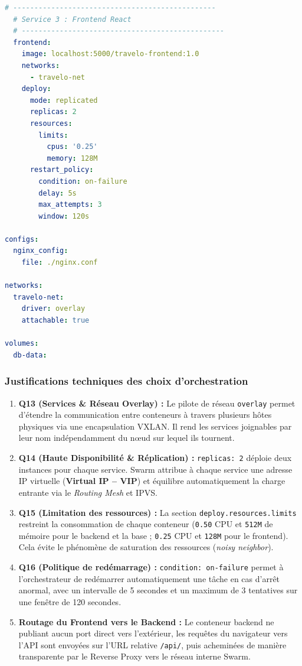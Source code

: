 \documentclass[11pt,a4paper]{article}
\begin{document}
\begin{lstlisting}[language=yaml]
  # ------------------------------------------------
  # Service 3 : Frontend React
  # ------------------------------------------------
  frontend:
    image: localhost:5000/travelo-frontend:1.0
    networks:
      - travelo-net
    deploy:
      mode: replicated
      replicas: 2
      resources:
        limits:
          cpus: '0.25'
          memory: 128M
      restart_policy:
        condition: on-failure
        delay: 5s
        max_attempts: 3
        window: 120s

configs:
  nginx_config:
    file: ./nginx.conf

networks:
  travelo-net:
    driver: overlay
    attachable: true

volumes:
  db-data:
\end{lstlisting}

\subsubsection{Justifications techniques des choix d'orchestration}
\begin{enumerate}
  \item \textbf{Q13 (Services \& Réseau Overlay) :} Le pilote de réseau \texttt{overlay} permet d'étendre la communication entre conteneurs à travers plusieurs hôtes physiques via une encapsulation VXLAN. Il rend les services joignables par leur nom indépendamment du nœud sur lequel ils tournent.
  \item \textbf{Q14 (Haute Disponibilité \& Réplication) :} \texttt{replicas: 2} déploie deux instances pour chaque service. Swarm attribue à chaque service une adresse IP virtuelle (\textbf{Virtual IP -- VIP}) et équilibre automatiquement la charge entrante via le \textit{Routing Mesh} et IPVS.
  \item \textbf{Q15 (Limitation des ressources) :} La section \texttt{deploy.resources.limits} restreint la consommation de chaque conteneur (\texttt{0.50} CPU et \texttt{512M} de mémoire pour le backend et la base ; \texttt{0.25} CPU et \texttt{128M} pour le frontend). Cela évite le phénomène de saturation des ressources (\textit{noisy neighbor}).
  \item \textbf{Q16 (Politique de redémarrage) :} \texttt{condition: on-failure} permet à l'orchestrateur de redémarrer automatiquement une tâche en cas d'arrêt anormal, avec un intervalle de 5 secondes et un maximum de 3 tentatives sur une fenêtre de 120 secondes.
  \item \textbf{Routage du Frontend vers le Backend :} Le conteneur backend ne publiant aucun port direct vers l'extérieur, les requêtes du navigateur vers l'API sont envoyées sur l'URL relative \texttt{/api/}, puis acheminées de manière transparente par le Reverse Proxy vers le réseau interne Swarm.
\end{enumerate}
\end{document}
